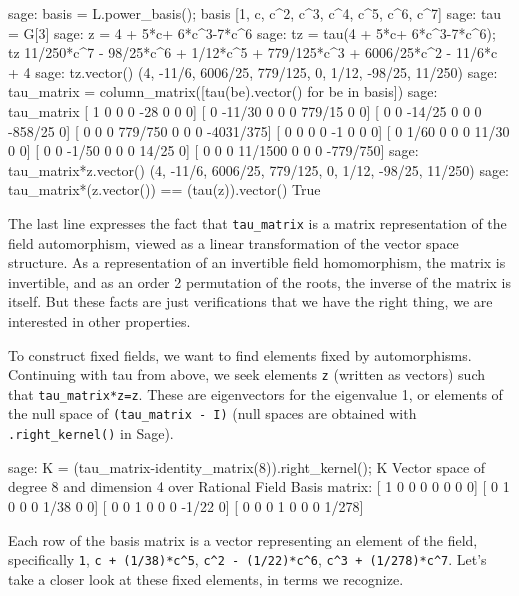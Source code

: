 \begin{sageexample}
sage: basis = L.power_basis(); basis
[1, c, c^2, c^3, c^4, c^5, c^6, c^7]
sage: tau = G[3]
sage: z = 4 + 5*c+ 6*c^3-7*c^6
sage: tz = tau(4 + 5*c+ 6*c^3-7*c^6); tz
11/250*c^7 - 98/25*c^6 + 1/12*c^5 + 779/125*c^3 +
6006/25*c^2 - 11/6*c + 4
sage: tz.vector()
(4, -11/6, 6006/25, 779/125, 0, 1/12, -98/25, 11/250)
sage: tau_matrix = column_matrix([tau(be).vector() for be in basis])
sage: tau_matrix
[  1       0       0        0  -28       0        0          0]
[  0  -11/30       0        0    0  779/15        0          0]
[  0       0  -14/25        0    0       0  -858/25          0]
[  0       0       0  779/750    0       0        0  -4031/375]
[  0       0       0        0   -1       0        0          0]
[  0    1/60       0        0    0   11/30        0          0]
[  0       0   -1/50        0    0       0    14/25          0]
[  0       0       0  11/1500    0       0        0   -779/750]
sage: tau_matrix*z.vector()
(4, -11/6, 6006/25, 779/125, 0, 1/12, -98/25, 11/250)
sage: tau_matrix*(z.vector()) == (tau(z)).vector()
True
\end{sageexample}
%
The last line expresses the fact that \verb?tau_matrix? is a matrix representation of the field automorphism, viewed as a linear transformation of the vector space structure.  As a representation of an invertible field homomorphism, the matrix is invertible, and as an order 2 permutation of the roots, the inverse of the matrix is itself.  But these facts are just verifications that we have the right thing, we are interested in other properties.\par
%
To construct fixed fields, we want to find elements fixed by automorphisms.  Continuing with tau from above, we seek elements \verb?z? (written as vectors) such that \verb?tau_matrix*z=z?.  These are eigenvectors for the eigenvalue 1, or elements of the null space of \verb?(tau_matrix - I)? (null spaces are obtained with \verb?.right_kernel()? in Sage).
%
\begin{sageexample}
sage: K = (tau_matrix-identity_matrix(8)).right_kernel(); K
Vector space of degree 8 and dimension 4 over Rational Field
Basis matrix:
[    1     0     0     0     0     0     0     0]
[    0     1     0     0     0  1/38     0     0]
[    0     0     1     0     0     0 -1/22     0]
[    0     0     0     1     0     0     0 1/278]
\end{sageexample}
%
Each row of the basis matrix is a vector representing an element of the field, specifically \verb?1?, \verb?c + (1/38)*c^5?, \verb?c^2 - (1/22)*c^6?, \verb?c^3 + (1/278)*c^7?.  Let's take a closer look at these fixed elements, in terms we recognize.

